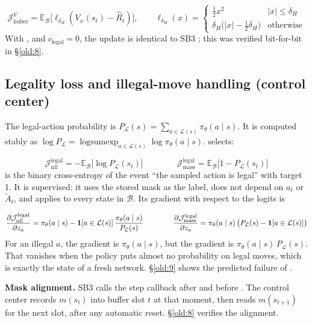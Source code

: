 \[
\mathcal{J}^V_{\text{huber}} = \mathbb{E}_{\mathcal{B}}\big[\ell_{\delta_H}(V_\psi(s_t) - \hat R_t)\big],
\qquad
\ell_{\delta_H}(x) = \begin{cases} \tfrac12 x^2 & \lvert x\rvert \leq \delta_H \\ \delta_H\big(\lvert x\rvert - \tfrac12\delta_H\big) & \text{otherwise} \end{cases}
\]
With ,  and $c_{\text{legal}} = 0$, the update is identical to SB3 ; this was verified bit-for-bit in \S\ref{old:8}.

\subsection{Legality loss and illegal-move handling (control center)}\label{old:5.4}

The legal-action probability is $P_{\mathcal{L}}(s) = \sum_{a \in \mathcal{L}(s)} \pi_\theta(a \mid s)$. It is computed stably as $\log P_{\mathcal{L}} = \operatorname{logsumexp}_{a \in \mathcal{L}(s)} \log \pi_\theta(a \mid s)$.  selects:

\[
\mathcal{J}^{\text{legal}}_{\text{nll}} = -\mathbb{E}_{\mathcal{B}}\big[\log P_{\mathcal{L}}(s_t)\big]
\qquad\qquad
\mathcal{J}^{\text{legal}}_{\text{mass}} = \mathbb{E}_{\mathcal{B}}\big[1 - P_{\mathcal{L}}(s_t)\big]
\]
 is the binary cross-entropy of the event ``the sampled action is legal'' with target 1. It is supervised: it uses the stored mask as the label, does not depend on $a_t$ or $\tilde A_t$, and applies to every state in $\mathcal{B}$. Its gradient with respect to the logits is

\[
\frac{\partial \mathcal{J}^{\text{legal}}_{\text{nll}}}{\partial z_a} = \pi_\theta(a \mid s) - \mathbf{1}[a \in \mathcal{L}(s)]\,\frac{\pi_\theta(a \mid s)}{P_{\mathcal{L}}(s)}
\qquad\qquad
\frac{\partial \mathcal{J}^{\text{legal}}_{\text{mass}}}{\partial z_a} = \pi_\theta(a \mid s)\,\big(P_{\mathcal{L}}(s) - \mathbf{1}[a \in \mathcal{L}(s)]\big)
\]
For an illegal $a$, the  gradient is $\pi_\theta(a \mid s)$, but the  gradient is $\pi_\theta(a \mid s)\,P_{\mathcal{L}}(s)$. That vanishes when the policy puts almost no probability on legal moves, which is exactly the state of a fresh network. \S\ref{old:9} shows the predicted failure of .

\textbf{Mask alignment.} SB3 calls the step callback after  and before . The control center records $m(s_t)$ into buffer slot $t$ at that moment, then reads $m(s_{t+1})$ for the next slot, after any automatic reset. \S\ref{old:8} verifies the alignment.

